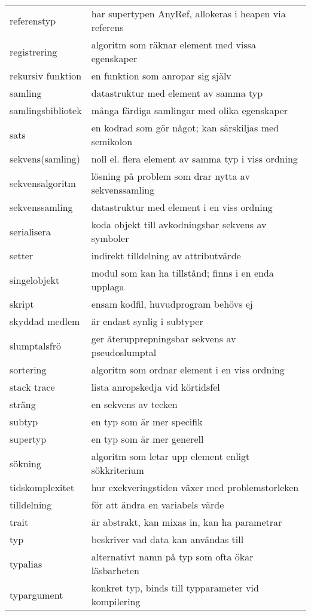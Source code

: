 \begin{tabular}{l|l}
referenstyp & har supertypen AnyRef, allokeras i heapen via referens \\
registrering & algoritm som räknar element med vissa egenskaper \\
rekursiv funktion & en funktion som anropar sig själv \\
samling & datastruktur med element av samma typ \\
samlingsbibliotek & många färdiga samlingar med olika egenskaper \\
sats & en kodrad som gör något; kan särskiljas med semikolon \\
sekvens(samling) & noll el. flera element av samma typ i viss ordning \\
sekvensalgoritm & lösning på problem som drar nytta av sekvenssamling \\
sekvenssamling & datastruktur med element i en viss ordning \\
serialisera & koda objekt till avkodningsbar sekvens av symboler \\
setter & indirekt tilldelning av attributvärde \\
singelobjekt & modul som kan ha tillstånd; finns i en enda upplaga \\
skript & ensam kodfil, huvudprogram behövs ej \\
skyddad medlem & är endast synlig i subtyper \\
slumptalsfrö & ger återupprepningsbar sekvens av pseudoslumptal \\
sortering & algoritm som ordnar element i en viss ordning \\
stack trace & lista anropskedja vid körtidsfel \\
sträng & en sekvens av tecken \\
subtyp & en typ som är mer specifik \\
supertyp & en typ som är mer generell \\
sökning & algoritm som letar upp element enligt sökkriterium \\
tidskomplexitet & hur exekveringstiden växer med problemstorleken \\
tilldelning & för att ändra en variabels värde \\
trait & är abstrakt, kan mixas in, kan ha parametrar \\
typ & beskriver vad data kan användas till \\
typalias & alternativt namn på typ som ofta ökar läsbarheten \\
typargument & konkret typ, binds till typparameter vid kompilering \\

\end{tabular}
